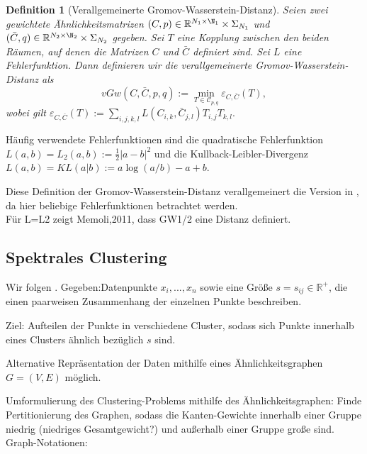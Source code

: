 \documentclass[twoside, 12pt,a4paper]{article}
\newtheorem{definition}[theorem]{Definition}
\numberwithin{equation}{section}
\begin{document}
	\begin{definition}[Verallgemeinerte Gromov-Wasserstein-Distanz]
		Seien zwei gewichtete Ähnlichkeitsmatrizen $(C,p) \in \mathbb{R}^{N_1 \times \N_1} \times \Sigma_{N_1}$ und $(\bar{C},q) \in \mathbb{R}^{N_2 \times \N_2} \times \Sigma_{N_2}$ gegeben. Sei $T$ eine Kopplung zwischen den beiden Räumen, auf denen die Matrizen $C$ und $\bar{C}$ definiert sind. Sei $L$ eine Fehlerfunktion. Dann definieren wir die verallgemeinerte Gromov-Wasserstein-Distanz als
		\begin{equation}
			vGw(C, \bar{C}, p, q) := \min_{T \in \mathcal{C}_{p, q}}{\mathcal{\varepsilon}_{C,\bar{C}}(T)},
		\end{equation}
		wobei gilt $\mathcal{\varepsilon}_{C,\bar{C}}(T) := \sum_{i,j,k,l}{L(C_{i,k}, \bar{C}_{j,l})T_{i,j}T_{k,l}}.$
		
	\end{definition}

	Häufig verwendete Fehlerfunktionen sind die quadratische Fehlerfunktion $L(a,b) = L_2(a,b) := \frac{1}{2}|a-b|^2$ und die Kullback-Leibler-Divergenz $L(a,b)  = KL(a|b) := a\log(a/b) -a+b$.
	
	Diese Definition der Gromov-Wasserstein-Distanz verallgemeinert die Version in \cite{gwd_averaging_kernels}, da hier beliebige Fehlerfunktionen betrachtet werden.\\
	
	Für L=L2 zeigt Memoli,2011, dass GW1/2 eine Distanz definiert.
	\subsection{Spektrales Clustering}
	Wir folgen \cite{spectralClustering_tut}.
	Gegeben:Datenpunkte $x_i, ..., x_n$ sowie eine Größe $s = s_{ij} \in \mathbb{R}^{+}$, die einen paarweisen Zusammenhang der einzelnen Punkte beschreiben.
	
	Ziel: Aufteilen der Punkte in verschiedene Cluster, sodass sich Punkte innerhalb eines Clusters ähnlich bezüglich $s$ sind.
	
	Alternative Repräsentation der Daten mithilfe eines Ähnlichkeitsgraphen $G=(V,E)$ möglich.
	
	Umformulierung des Clustering-Problems mithilfe des Ähnlichkeitsgraphen: Finde Pertitionierung des Graphen, sodass die Kanten-Gewichte innerhalb einer Gruppe niedrig (niedriges Gesamtgewicht?) und außerhalb einer Gruppe große sind.\\
	
	
	Graph-Notationen:\\
	
\end{document}
